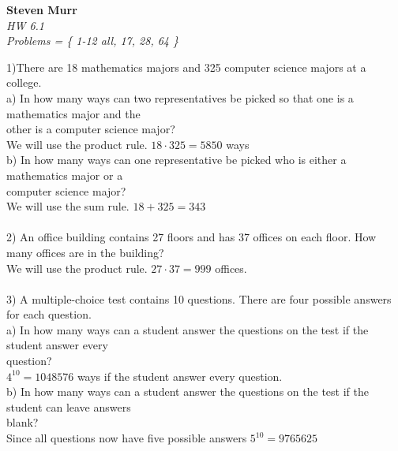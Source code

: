 \documentclass{article}
\begin{document}
\setcounter{totalnumber}{5}
   \begin{flushright}
      \Large\textbf{Steven Murr}\\
      \large\textit{HW 6.1} \\
      \large\textit{Problems = \{ 1-12 all, 17, 28, 64 \} }
   \end{flushright}
\begin{flushleft}
\makeatletter%
\setlength{\@fptop}{5pt}
\makeatother
\setlength\parindent{0pt}1)There are 18 mathematics majors and 325 computer science majors at a college. \\
\setlength\parindent{24pt}a) In how many ways can two representatives be picked so that one is a mathematics major and the \\other is a computer science major? \\
\setlength\parindent{48pt} We will use the product rule.  $18 \cdot 325 = 5850$ ways \\
\setlength\parindent{24pt}b) In how many ways can one representative be picked who is either a mathematics major or a \\computer science major? \\
\setlength\parindent{48pt} We will use the sum rule.  $18+325 = 343$ \\
~\\
\setlength\parindent{0pt}2) An office building contains 27 floors and has 37 offices on each floor.  How many offices are in the building? \\
\setlength\parindent{24pt}We will use the product rule.  $27\cdot 37 = 999$ offices. \\
~\\
\setlength\parindent{0pt}3) A multiple-choice test contains 10 questions.  There are four possible answers for each question.  \\
\setlength\parindent{24pt}a) In how many ways can a student answer the questions on the test if the student answer every \\question? \\
\setlength\parindent{48pt} $4^10 = 1048576$ ways if the student answer every question. \\
\setlength\parindent{24pt}b) In how many ways can a student answer the questions on the test if the student can leave answers \\blank? \\
\setlength\parindent{48pt} Since all questions now have five possible answers $5^10 = 9765625$ \\

\end{flushleft}
\end{document}
